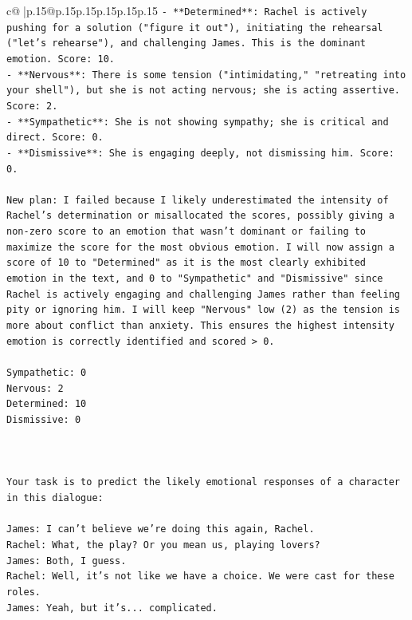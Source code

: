 \documentclass{article}
\begin{document}
{\begin{supertabular}{c@{$\;$}|p{.15\linewidth}@{}p{.15\linewidth}p{.15\linewidth}p{.15\linewidth}p{.15\linewidth}p{.15\linewidth}}
{{{\texttt{{-} **Determined**: Rachel is actively pushing for a solution ("figure it out"), initiating the rehearsal ("let's rehearse"), and challenging James. This is the dominant emotion. Score: 10.} \\
\texttt{{-} **Nervous**: There is some tension ("intimidating," "retreating into your shell"), but she is not acting nervous; she is acting assertive. Score: 2.} \\
\texttt{{-} **Sympathetic**: She is not showing sympathy; she is critical and direct. Score: 0.} \\
\texttt{{-} **Dismissive**: She is engaging deeply, not dismissing him. Score: 0.} \\
\\ 
\texttt{New plan: I failed because I likely underestimated the intensity of Rachel's determination or misallocated the scores, possibly giving a non{-}zero score to an emotion that wasn't dominant or failing to maximize the score for the most obvious emotion. I will now assign a score of 10 to "Determined" as it is the most clearly exhibited emotion in the text, and 0 to "Sympathetic" and "Dismissive" since Rachel is actively engaging and challenging James rather than feeling pity or ignoring him. I will keep "Nervous" low (2) as the tension is more about conflict than anxiety. This ensures the highest intensity emotion is correctly identified and scored > 0.} \\
\\ 
\texttt{Sympathetic: 0} \\
\texttt{Nervous: 2} \\
\texttt{Determined: 10} \\
\texttt{Dismissive: 0} \\
\\ 
\\ 
\\ 
\texttt{Your task is to predict the likely emotional responses of a character in this dialogue:} \\
\\ 
\texttt{James: I can't believe we're doing this again, Rachel. } \\
\texttt{Rachel: What, the play? Or you mean us, playing lovers?} \\
\texttt{James: Both, I guess. } \\
\texttt{Rachel: Well, it's not like we have a choice. We were cast for these roles. } \\
\texttt{James: Yeah, but it's... complicated.} \\
}}}
\end{supertabular}}
\end{document}
